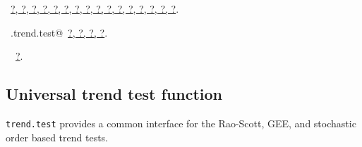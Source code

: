 \documentclass[reqno]{amsart}
\renewcommand{\NWlink}[2]{\hyperlink{#1}{#2}}
\begin{document}
\begin{flushleft}
\vspace{-1.5ex}
\footnotesize
\begin{list}{}{\setlength{\itemsep}{-\parsep}\setlength{\itemindent}{-\leftmargin}}
\item \NWtxtFileDefBy\ \NWlink{nuweb?}{?}\NWlink{nuweb?}{, ?}\NWlink{nuweb?}{, ?}\NWlink{nuweb?}{, ?}\NWlink{nuweb?}{, ?}\NWlink{nuweb?}{, ?}\NWlink{nuweb?}{, ?}\NWlink{nuweb?}{, ?}\NWlink{nuweb?}{, ?}\NWlink{nuweb?}{, ?}\NWlink{nuweb?}{, ?}\NWlink{nuweb?}{, ?}\NWlink{nuweb?}{, ?}\NWlink{nuweb?}{, ?}\NWlink{nuweb?}{, ?}\NWlink{nuweb?}{, ?}.
\item \NWtxtIdentsDefed\nobreak\  \verb@SO.trend.test@\nobreak\ \NWlink{nuweb?}{?}\NWlink{nuweb?}{, ?}\NWlink{nuweb?}{, ?}\NWlink{nuweb?}{, ?}.\item \NWtxtIdentsUsed\nobreak\  \verb@soControl@\nobreak\ \NWlink{nuweb?}{?}.
\item{}
\end{list}
\vspace{4ex}
\end{flushleft}
\subsection{Universal trend test function}
\texttt{trend.test} provides a common interface for the Rao-Scott, GEE, and stochastic
order based trend tests.
\end{document}

